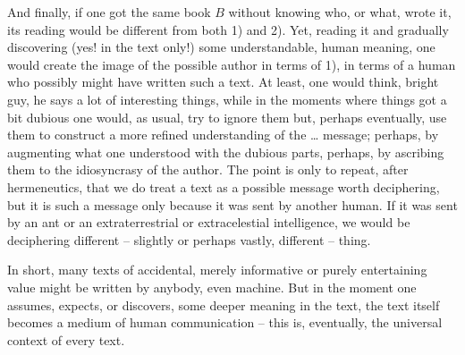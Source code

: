 And finally, if one got the same book $B$ without knowing who, or what,
wrote it, its reading would be different from both 1) and 2).  Yet,
reading it and gradually discovering (yes!  in the text only!)  some
understandable, human meaning, one would create the image of
the possible author in terms of 1), in terms of a human who possibly
might have written such a text.  At least, one would think, bright guy,
he says a lot of interesting things, while in the moments where things 
got a bit dubious one would, as usual, try to ignore them but, perhaps 
eventually, use them to construct a more refined understanding of the \ldots 
message; perhaps, by augmenting what one understood with the dubious 
parts, perhaps, by ascribing them to the idiosyncrasy of the author. 
The point is only to repeat, after hermeneutics, that we
do treat a text as a possible message worth deciphering, 
but it is such a message only because it was sent by another human. If 
it was sent by an ant or an extraterrestrial or extracelestial intelligence, we would be 
deciphering different -- slightly or perhaps vastly, different -- 
thing. 

In short, many texts of accidental, merely informative or purely entertaining
value might be written by anybody, even machine.  But in the moment one assumes,
expects, or discovers, some deeper meaning in the text, the text itself becomes
a medium of human communication -- this is, eventually, the universal context of
every text.


